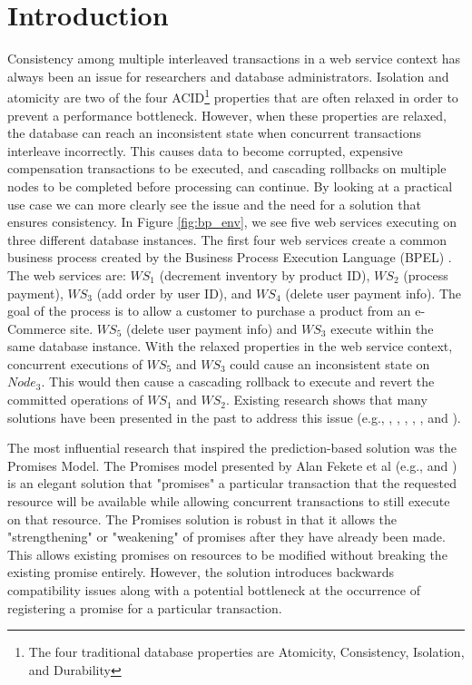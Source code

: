 \documentclass[conference]{IEEEtran}
\begin{document}
\section{Introduction}
Consistency among multiple interleaved transactions in a web service context has always been an issue for researchers and database administrators. Isolation and atomicity are two of the four ACID\footnote{The four traditional database properties are Atomicity, Consistency, Isolation, and Durability} properties that are often relaxed in order to prevent a performance bottleneck. However, when these properties are relaxed, the database can reach an inconsistent state when concurrent transactions interleave incorrectly. This causes data to become corrupted, expensive compensation transactions to be executed, and cascading rollbacks on multiple nodes to be completed before processing can continue. By looking at a practical use case we can more clearly see the issue and the need for a solution that ensures consistency. In Figure \ref{fig:bp_env}, we see five web services executing on three different database instances. The first four web services  create a common business process created by the Business Process Execution Language (BPEL) \cite{BPEL}. The web services are: $WS_{1}$ (decrement inventory by product ID), $WS_{2}$ (process payment), $WS_{3}$ (add order by user ID), and $WS_{4}$ (delete user payment info). The goal of the process is to allow a customer to purchase a product from an e-Commerce site. $WS_{5}$ (delete user payment info) and $WS_{3}$ execute within the same database instance. With the relaxed properties in the web service context, concurrent executions of $WS_{5}$ and $WS_{3}$ could cause an inconsistent state on $Node_{3}$. This would then cause a cascading rollback to execute and revert the committed operations of $WS_{1}$ and $WS_{2}$. Existing research shows that many solutions have been presented in the past to address this issue (e.g., \cite{Fekete_SnapshotIso}, \cite{Alrifai_Distributed_Managment}, \cite{Fekete_RAMP}, \cite{Fekete_IsolationSupport}, \cite{Jacobi_Locking}, and \cite{Fekete_Promises}). 

The most influential research that inspired the prediction-based solution was the Promises Model. The Promises model presented by Alan Fekete et al (e.g., \cite{Fekete_IsolationSupport} and \cite{Fekete_Promises}) is an elegant solution that "promises" a particular transaction that the requested resource will be available while allowing concurrent transactions to still execute on that resource. The Promises solution is robust in that it allows the "strengthening" or "weakening" of promises after they have already been made. This allows existing promises on resources to be modified without breaking the existing promise entirely. However, the solution introduces backwards compatibility issues along with a potential bottleneck at the occurrence of registering a promise for a particular transaction. 
\end{document}
